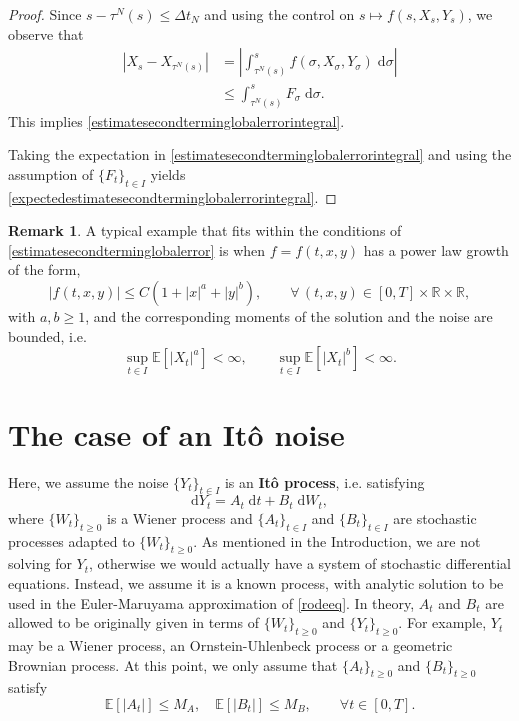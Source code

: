 \documentclass[reqno,12pt]{amsart}
\theoremstyle{plain}%
\theoremstyle{definition}
\newtheorem{rmk}{Remark}[section]
\begin{document}
\begin{proof}
    Since $s - \tau^N(s) \leq \Delta t_N$ and using the control on $s \mapsto f(s, X_s, Y_s)$, we observe that
    \begin{align*}
      \left|X_s - X_{\tau^N(s)}\right| & = \left|\int_{\tau^N(s)}^s f(\sigma, X_\sigma, Y_\sigma)\;\mathrm{d}\sigma\right| \\
      & \leq \int_{\tau^N(s)}^s F_\sigma \;\mathrm{d}\sigma.
    \end{align*}
    This implies \eqref{estimatesecondterminglobalerrorintegral}.

    Taking the expectation in \eqref{estimatesecondterminglobalerrorintegral} and using the assumption of $\{F_t\}_{t\in I}$ yields \eqref{expectedestimatesecondterminglobalerrorintegral}.
\end{proof}

\begin{rmk}
    A typical example that fits within the conditions of \cref{estimatesecondterminglobalerror} is when $f=f(t, x, y)$ has a power law growth of the form,
    \[
      |f(t, x, y)| \leq C(1 + |x|^a + |y|^b), \qquad \forall\,(t, x, y) \in [0, T] \times \mathbb{R}\times\mathbb{R},
    \]
    with $a, b \geq 1$, and the corresponding moments of the solution and the noise are bounded, i.e.
    \[
      \sup_{t\in I}\mathbb{E}[|X_t|^a]  < \infty, \qquad \sup_{t\in I}\mathbb{E}[|X_t|^b] < \infty.
    \]
\end{rmk}

\section{The case of an It\^o noise}

Here, we assume the noise $\{Y_t\}_{t\in I}$ is an \textbf{It\^o process}, i.e. satisfying
\begin{equation}
  \label{itoprocess}
  \mathrm{d}Y_t = A_t \;\mathrm{d}t + B_t \;\mathrm{d}W_t,
\end{equation}
where $\{W_t\}_{t\geq 0}$ is a Wiener process and $\{A_t\}_{t \in I}$ and $\{B_t\}_{t \in I}$ are stochastic processes adapted to $\{W_t\}_{t\geq 0}$. As mentioned in the Introduction, we are not solving for $Y_t$, otherwise we would actually have a system of stochastic differential equations. Instead, we assume it is a known process, with analytic solution to be used in the Euler-Maruyama approximation of \eqref{rodeeq}. In theory, $A_t$ and $B_t$ are allowed to be originally given in terms of $\{W_t\}_{t\geq 0}$ and $\{Y_t\}_{t\geq 0}$. For example, $Y_t$ may be a Wiener process, an Ornstein-Uhlenbeck process or a geometric Brownian process. At this point, we only assume that $\{A_t\}_{t \geq 0}$ and $\{B_t\}_{t \geq 0}$ satisfy
\begin{equation}
    \label{EAtEBtbound}
    \mathbb{E}[|A_t|] \leq M_A, \quad \mathbb{E}[|B_t|] \leq M_B, \qquad \forall t \in [0, T].
\end{equation}
\end{document}
